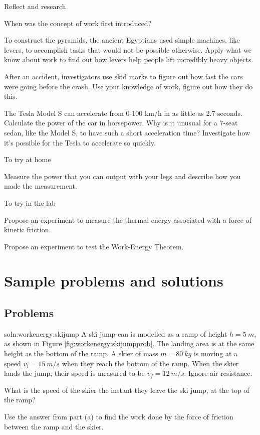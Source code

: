 \begin{chapteractivity}{Reflect and research}
{
\item When was the concept of work first introduced?
\item To construct the pyramids, the ancient Egyptians used simple machines, like levers, to accomplish tasks that would not be possible otherwise. Apply what we know about work to find out how levers help people lift incredibly heavy objects. 
\item After an accident, investigators use skid marks to figure out how fast the cars were going before the crash. Use your knowledge of work, figure out how they do this.
\item The Tesla Model S can accelerate from 0-100 \si{km/h} in as little as 2.7 seconds. Calculate the power of the car in horsepower. Why is it unusual for a 7-seat sedan, like the Model S, to have such a short acceleration time? Investigate how it's possible for the Tesla to accelerate so quickly. 
}
\end{chapteractivity}

\begin{chapteractivity}{To try at home}
{
\item Measure the power that you can output with your legs and describe how you made the measurement.
}
\end{chapteractivity}

\begin{chapteractivity}{To try in the lab}
{
\item Propose an experiment to measure the thermal energy associated with a force of kinetic friction. 
\item Propose an experiment to test the Work-Energy Theorem.
}
\end{chapteractivity}
\newpage
\section{Sample problems and solutions}
\subsection{Problems}
\begin{problemParts}{soln:workenergy:skijump}{\label{prob:workenergy:skijump} A ski jump can is modelled as a ramp of height $h=\SI{5}{m}$, as shown in Figure \ref{fig:workenergy:skijumpprob}. The landing area is at the same height as the bottom of the ramp. A skier of mass $m=\SI{80}{kg}$ is moving at a speed $v_i=\SI{15}{m/s}$ when they reach the bottom of the ramp. When the skier lands the jump, their speed is measured to be $v_f=\SI{12}{m/s}$. Ignore air resistance. 
}
\item What is the speed of the skier the instant they leave the ski jump, at the top of the ramp?
\item Use the answer from part (a) to find the work done by the force of friction between the ramp and the skier.
\end{problemParts}


